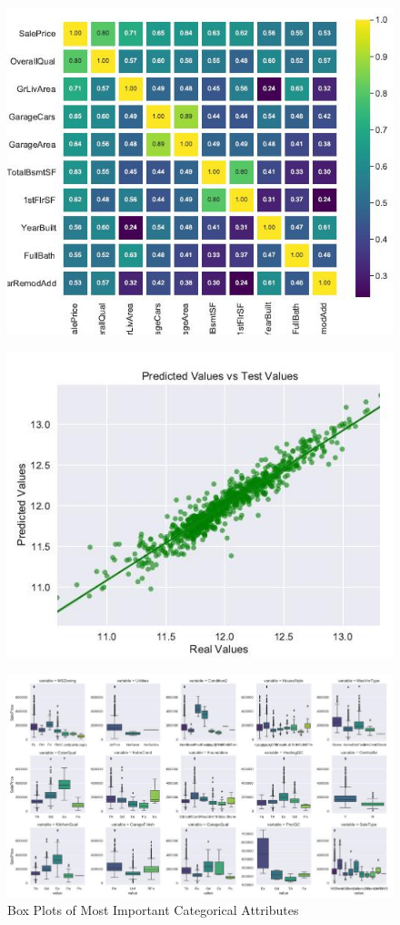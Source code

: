 \documentclass[onecolumn]{article}
\begin{document}
\begin{figure}[h]
\centering
\begin{minipage}{.5\textwidth}
  \centering
  \includegraphics[width=.7\linewidth]{corr_important.jpg}
  \label{fig:corr_important}
\end{minipage}%
\begin{minipage}{.5\textwidth}
  \centering
  \includegraphics[width=.7\linewidth]{feature_sel_reg.jpg}
  \label{fig:feature_sel_reg}
\end{minipage}
\end{figure}


\begin{figure}[h]
\centering
  \includegraphics[width=0.7\linewidth]{boxplot_important.jpg}
  \caption{Box Plots of Most Important Categorical Attributes}
  \label{fig:boxplot_important}
\end{figure}
\end{document}
